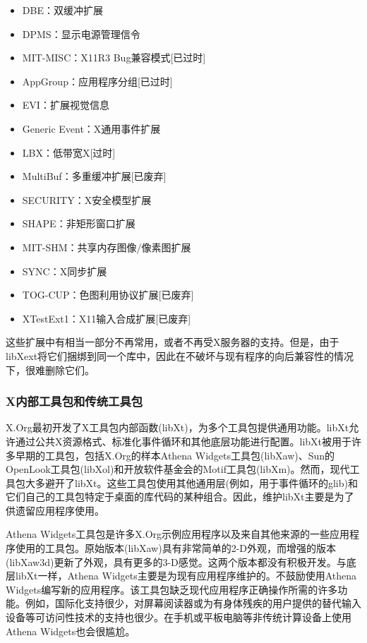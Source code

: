\begin{itemize}
	\item DBE：双缓冲扩展
	\item DPMS：显示电源管理信令
	\item MIT-MISC：X11R3 Bug兼容模式[已过时]
	\item AppGroup：应用程序分组[已过时]
	\item EVI：扩展视觉信息
	\item Generic Event：X通用事件扩展
	\item LBX：低带宽X[过时]
	\item MultiBuf：多重缓冲扩展[已废弃]
	\item SECURITY：X安全模型扩展
	\item SHAPE：非矩形窗口扩展
	\item MIT-SHM：共享内存图像/像素图扩展
	\item SYNC：X同步扩展
	\item TOG-CUP：色图利用协议扩展[已废弃]
	\item XTestExt1：X11输入合成扩展[已废弃]
\end{itemize}

这些扩展中有相当一部分不再常用，或者不再受X服务器的支持。但是，由于libXext将它们捆绑到同一个库中，因此在不破坏与现有程序的向后兼容性的情况下，很难删除它们。

\subsubsection{X内部工具包和传统工具包}

X.Org最初开发了X工具包内部函数(libXt)，为多个工具包提供通用功能。libXt允许通过公共X资源格式、标准化事件循环和其他底层功能进行配置。libXt被用于许多早期的工具包，包括X.Org的样本Athena Widgets工具包(libXaw)、Sun的OpenLook工具包(libXol)和开放软件基金会的Motif工具包(libXm)。然而，现代工具包大多避开了libXt。这些工具包使用其他通用层(例如，用于事件循环的glib)和它们自己的工具包特定于桌面的库代码的某种组合。因此，维护libXt主要是为了供遗留应用程序使用。

Athena Widgets工具包是许多X.Org示例应用程序以及来自其他来源的一些应用程序使用的工具包。原始版本(libXaw)具有非常简单的2-D外观，而增强的版本(libXaw3d)更新了外观，具有更多的3-D感觉。这两个版本都没有积极开发。与底层libXt一样，Athena Widgets主要是为现有应用程序维护的。不鼓励使用Athena Widgets编写新的应用程序。该工具包缺乏现代应用程序正确操作所需的许多功能。例如，国际化支持很少，对屏幕阅读器或为有身体残疾的用户提供的替代输入设备等可访问性技术的支持也很少。在手机或平板电脑等非传统计算设备上使用Athena Widgets也会很尴尬。

